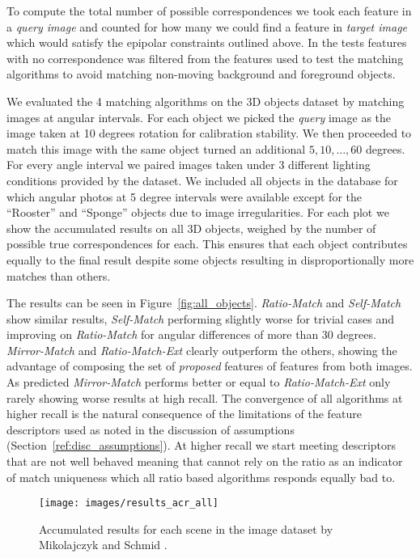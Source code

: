 \documentclass[journal]{IEEEtran}
\begin{document}
To compute the total number of possible correspondences we took each 
feature in a \emph{query image} and counted for how many we could find a 
feature in \emph{target image} which would satisfy the epipolar 
constraints outlined above. In the tests features with no correspondence 
was filtered from the features used to test the matching algorithms to 
avoid matching non-moving background and foreground objects.

We evaluated the 4 matching algorithms on the 3D objects dataset by 
matching images at angular intervals. For each object we picked the 
\emph{query} image as the image taken at 10 degrees rotation for 
calibration stability.  We then proceeded to match this image with the 
same object turned an additional $5, 10, \ldots, 60$ degrees. For every 
angle interval we paired images taken under 3 different lighting 
conditions provided by the dataset.
We included all objects in the database for which angular photos at 5 
degree intervals were available except for the ``Rooster'' and 
``Sponge'' objects due to image irregularities. For each plot we show 
the accumulated results on all 3D objects, weighed by the number of 
possible true correspondences for each. This ensures that each object 
contributes equally to the final result despite some objects
resulting in disproportionally more matches than others.

The results can be seen in Figure~\ref{fig:all_objects}.  
\emph{Ratio-Match} and \emph{Self-Match} show similar results, 
\emph{Self-Match} performing slightly worse for trivial cases and 
improving on \emph{Ratio-Match} for angular differences of more than 30 
degrees. \emph{Mirror-Match} and \emph{Ratio-Match-Ext} clearly 
outperform the others, showing the advantage of composing the set of 
\emph{proposed} features of features from both images. As predicted 
\emph{Mirror-Match} performs better or equal to \emph{Ratio-Match-Ext} 
only rarely showing worse results at high recall. The convergence of all 
algorithms at higher recall is the natural consequence of the 
limitations of the feature descriptors used as noted in the discussion 
of assumptions (Section~\ref{ref:disc_assumptions}). At higher recall we 
start meeting descriptors that are not well behaved meaning that cannot 
rely on the ratio as an indicator of match uniqueness which all ratio 
based algorithms responds equally bad to.

\begin{figure*}[t!]
	\centering
    \texttt{[image: images/results\_acr\_all]}
    \caption{Accumulated results for each scene in the image dataset by 
    Mikolajczyk and Schmid \cite{mikolajczyk2005performance}.}
    \label{fig:acr_objects}
\end{figure*}
\end{document}
